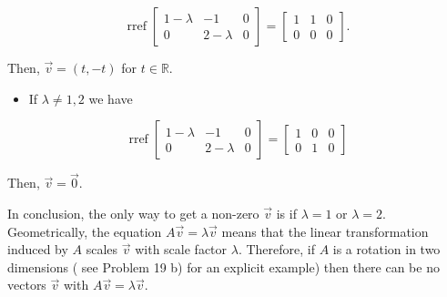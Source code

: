 \documentclass[10pt]{article}
\begin{document}
$$
\operatorname{rref}\left[\begin{array}{cc|c}
1-\lambda & -1 & 0 \\
0 & 2-\lambda & 0
\end{array}\right]=\left[\begin{array}{ll|l}
1 & 1 & 0 \\
0 & 0 & 0
\end{array}\right] .
$$

Then, $\vec{v}=(t,-t)$ for $t \in \mathbb{R}$.

\begin{itemize}
  \item If $\lambda \neq 1,2$ we have
\end{itemize}

$$
\operatorname{rref}\left[\begin{array}{cc|c}
1-\lambda & -1 & 0 \\
0 & 2-\lambda & 0
\end{array}\right]=\left[\begin{array}{ll|l}
1 & 0 & 0 \\
0 & 1 & 0
\end{array}\right]
$$

Then, $\vec{v}=\overrightarrow{0}$.

In conclusion, the only way to get a non-zero $\vec{v}$ is if $\lambda=1$ or $\lambda=2$.\\
Geometrically, the equation $A \vec{v}=\lambda \vec{v}$ means that the linear transformation induced by $A$ scales $\vec{v}$ with scale factor $\lambda$. Therefore, if $A$ is a rotation in two dimensions ( see Problem 19 b) for an explicit example) then there can be no vectors $\vec{v}$ with $A \vec{v}=\lambda \vec{v}$.
\end{document}
